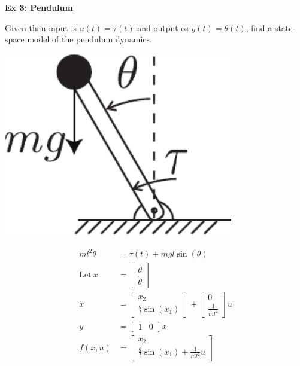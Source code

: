 \documentclass[twoside]{article}
\begin{document}
\vspace{6pt}

\textbf{Ex 3: Pendulum}

Given than input is $u(t) = \tau(t)$ and output os $y(t) = \theta(t)$,
find a state-space model of the pendulum dynamics.

  \begin{minipage}[h]{0.4\linewidth}
    \begin{center}
      \includegraphics[width=0.75\textwidth]{pendulum}
    \end{center}
  \end{minipage}
  \begin{minipage}[h]{0.6\linewidth}
    \begin{center}
    {\large
  \begin{align*}
       m l^2 \ddot{\theta} &= \tau(t) + m g l \sin(\theta)
	\\
	\mathrm{Let} \ x &= \left[ \begin{array}{c} \theta \\ \dot{\theta} \end{array} \right] 
	\\
	\dot{x} &= \left[ \begin{array}{c} x_2 \\ \frac{g}{l}
                           \sin(x_1) \end{array} \right] +
    \left[ \begin{array}{c} 0 \\ \frac{1}{m l^2} \end{array} \right] u
	\\
        y &= \left[ \begin{array}{cc} 1 & 0 \end{array} \right] x
	\\
       f(x,u) &= \left[ \begin{array}{c} x_2 \\ \frac{g}{l}
                           \sin(x_1) + \frac{1}{m l^2} u \end{array} \right]  
  \end{align*}
  }
    \end{center}
  \end{minipage}
\end{document}
